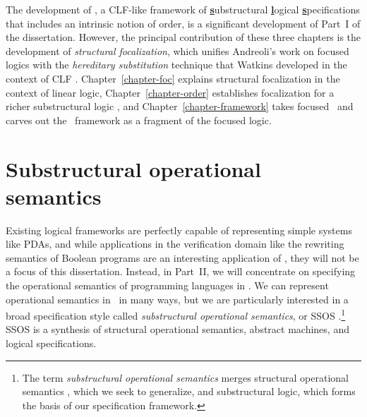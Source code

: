 The development of \sls, a CLF-like framework of \underline{\bf
  s}ubstructural \underline{\bf l}ogical \underline{\bf
  s}pecifications that includes an intrinsic notion of order, is a
significant development of Part~I of the dissertation.  However, the
principal contribution of these three chapters is the development of
{\it structural focalization}, which
unifies Andreoli's work on focused logics \cite{andreoli92logic} with
the {\it hereditary substitution} technique that Watkins developed in
the context of CLF
\cite{watkins02concurrent}. Chapter~\ref{chapter-foc} explains
structural focalization in the context of linear logic,
Chapter~\ref{chapter-order} establishes focalization for a richer
substructural logic \ollll, and Chapter~\ref{chapter-framework} takes
focused \ollll~and carves out the \sls~framework as a fragment of the
focused logic.

\section{Substructural operational semantics}
\label{sec:intro-ssos}

Existing logical frameworks are perfectly capable of representing
simple systems like PDAs, and while applications in the verification
domain like the rewriting semantics of Boolean programs are an
interesting application of \sls, they will not be a focus of this
dissertation. Instead, in Part~II, we will concentrate on
specifying the operational semantics of programming languages in \sls.
%
We can represent operational semantics in
\sls~in many ways, but we are particularly interested in a broad
specification style called {\it substructural operational semantics},
or SSOS
\cite{pfenning04substructural,pfenning09substructural}.\footnote{The
  term {\it substructural operational semantics} merges structural
  operational semantics \cite{plotkin04structural}, which we seek to
  generalize, and substructural logic, which forms the basis of our
  specification framework.} SSOS is a synthesis of structural
operational semantics, abstract machines, and logical specifications.

